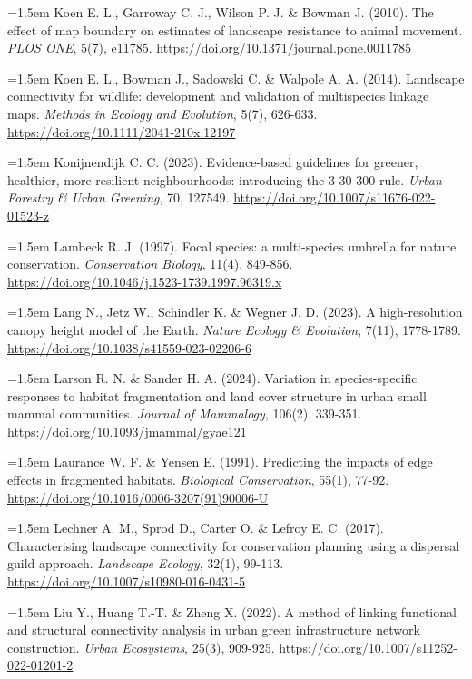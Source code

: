 \documentclass[a4paper,12pt]{report}
\begin{document}
\noindent\hangindent=1.5em Koen E. L., Garroway C. J., Wilson P. J. \& Bowman J. (2010). The effect of map boundary on estimates of landscape resistance to animal movement. \textit{PLOS ONE}, 5(7), e11785. \url{https://doi.org/10.1371/journal.pone.0011785}\par\medskip
\noindent\hangindent=1.5em Koen E. L., Bowman J., Sadowski C. \& Walpole A. A. (2014). Landscape connectivity for wildlife: development and validation of multispecies linkage maps. \textit{Methods in Ecology and Evolution}, 5(7), 626-633. \url{https://doi.org/10.1111/2041-210x.12197}\par\medskip
\noindent\hangindent=1.5em Konijnendijk C. C. (2023). Evidence-based guidelines for greener, healthier, more resilient neighbourhoods: introducing the 3-30-300 rule. \textit{Urban Forestry \& Urban Greening}, 70, 127549. \url{https://doi.org/10.1007/s11676-022-01523-z}\par\medskip
\noindent\hangindent=1.5em Lambeck R. J. (1997). Focal species: a multi-species umbrella for nature conservation. \textit{Conservation Biology}, 11(4), 849-856. \url{https://doi.org/10.1046/j.1523-1739.1997.96319.x}\par\medskip
\noindent\hangindent=1.5em Lang N., Jetz W., Schindler K. \& Wegner J. D. (2023). A high-resolution canopy height model of the Earth. \textit{Nature Ecology \& Evolution}, 7(11), 1778-1789. \url{https://doi.org/10.1038/s41559-023-02206-6}\par\medskip
\noindent\hangindent=1.5em Larson R. N. \& Sander H. A. (2024). Variation in species-specific responses to habitat fragmentation and land cover structure in urban small mammal communities. \textit{Journal of Mammalogy}, 106(2), 339-351. \url{https://doi.org/10.1093/jmammal/gyae121}\par\medskip
\noindent\hangindent=1.5em Laurance W. F. \& Yensen E. (1991). Predicting the impacts of edge effects in fragmented habitats. \textit{Biological Conservation}, 55(1), 77-92. \url{https://doi.org/10.1016/0006-3207(91)90006-U}\par\medskip
\noindent\hangindent=1.5em Lechner A. M., Sprod D., Carter O. \& Lefroy E. C. (2017). Characterising landscape connectivity for conservation planning using a dispersal guild approach. \textit{Landscape Ecology}, 32(1), 99-113. \url{https://doi.org/10.1007/s10980-016-0431-5}\par\medskip
\noindent\hangindent=1.5em Liu Y., Huang T.-T. \& Zheng X. (2022). A method of linking functional and structural connectivity analysis in urban green infrastructure network construction. \textit{Urban Ecosystems}, 25(3), 909-925. \url{https://doi.org/10.1007/s11252-022-01201-2}\par\medskip
\end{document}
